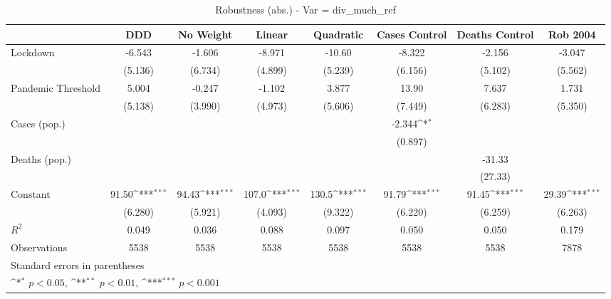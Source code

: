 \documentclass{article}
\begin{document}
{
\def\sym#1{\ifmmode^{#1}\else\(^{#1}\)\fi}
\begin{longtable}{l*{7}{c}}
\caption{Robustness (abs.) - Var = div\_much\_ref}\\
\hline\hline\endfirsthead\hline\endhead\hline\endfoot\endlastfoot
                &\multicolumn{1}{c}{DDD}&\multicolumn{1}{c}{No Weight}&\multicolumn{1}{c}{Linear}&\multicolumn{1}{c}{Quadratic}&\multicolumn{1}{c}{Cases Control}&\multicolumn{1}{c}{Deaths Control}&\multicolumn{1}{c}{Rob 2004}\\
\hline
Lockdown        &   -6.543         &   -1.606         &   -8.971         &   -10.60         &   -8.322         &   -2.156         &   -3.047         \\
                &  (5.136)         &  (6.734)         &  (4.899)         &  (5.239)         &  (6.156)         &  (5.102)         &  (5.562)         \\
Pandemic Threshold&    5.004         &   -0.247         &   -1.102         &    3.877         &    13.90         &    7.637         &    1.731         \\
                &  (5.138)         &  (3.990)         &  (4.973)         &  (5.606)         &  (7.449)         &  (6.283)         &  (5.350)         \\
Cases (pop.)    &                  &                  &                  &                  &   -2.344\sym{*}  &                  &                  \\
                &                  &                  &                  &                  &  (0.897)         &                  &                  \\
Deaths (pop.)   &                  &                  &                  &                  &                  &   -31.33         &                  \\
                &                  &                  &                  &                  &                  &  (27.33)         &                  \\
Constant        &    91.50\sym{***}&    94.43\sym{***}&    107.0\sym{***}&    130.5\sym{***}&    91.79\sym{***}&    91.45\sym{***}&    29.39\sym{***}\\
                &  (6.280)         &  (5.921)         &  (4.093)         &  (9.322)         &  (6.220)         &  (6.259)         &  (6.263)         \\
\hline
\(R^{2}\)       &    0.049         &    0.036         &    0.088         &    0.097         &    0.050         &    0.050         &    0.179         \\
Observations    &     5538         &     5538         &     5538         &     5538         &     5538         &     5538         &     7878         \\
\hline\hline
\multicolumn{8}{l}{\footnotesize Standard errors in parentheses}\\
\multicolumn{8}{l}{\footnotesize \sym{*} \(p<0.05\), \sym{**} \(p<0.01\), \sym{***} \(p<0.001\)}\\
\end{longtable}
}
\end{document}
